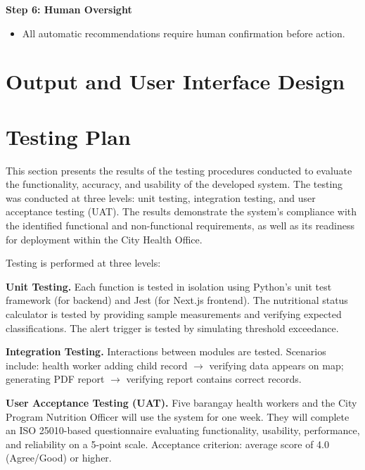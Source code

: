 \documentclass[12pt, a4paper]{report}
\begin{document}
\noindent \textbf{Step 6: Human Oversight}
\begin{itemize}
    \item All automatic recommendations require human confirmation before action.
\end{itemize}

\section{Output and User Interface Design}
\label{sec:ui_design}


\section{Testing Plan}
\label{sec:testing_plan}
This section presents the results of the testing procedures conducted to evaluate the functionality, accuracy, and usability of the developed system. The testing was conducted at three levels: unit testing, integration testing, and user acceptance testing (UAT). The results demonstrate the system's compliance with the identified functional and non-functional requirements, as well as its readiness for deployment within the City Health Office.

Testing is performed at three levels:

\noindent \textbf{Unit Testing.} Each function is tested in isolation using Python's unit test framework (for backend) and Jest (for Next.js frontend). The nutritional status calculator is tested by providing sample measurements and verifying expected classifications. The alert trigger is tested by simulating threshold exceedance.

\noindent \textbf{Integration Testing.} Interactions between modules are tested. Scenarios include: health worker adding child record \(\rightarrow\) verifying data appears on map; generating PDF report \(\rightarrow\) verifying report contains correct records.

\noindent \textbf{User Acceptance Testing (UAT).} Five barangay health workers and the City Program Nutrition Officer will use the system for one week. They will complete an ISO 25010-based questionnaire evaluating functionality, usability, performance, and reliability on a 5-point scale. Acceptance criterion: average score of 4.0 (Agree/Good) or higher.
\end{document}
